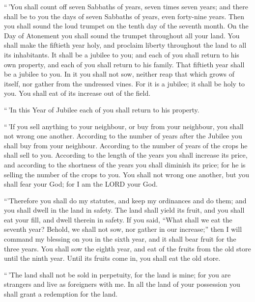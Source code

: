 ``\,'You shall count off seven Sabbaths of years, seven
times seven years; and there shall be to you the days of seven Sabbaths
of years, even forty-nine years.  Then you shall sound the
loud trumpet on the tenth day of the seventh month. On the Day of
Atonement you shall sound the trumpet throughout all your land.
 You shall make the fiftieth year holy, and proclaim
liberty throughout the land to all its inhabitants. It shall be a
jubilee to you; and each of you shall return to his own property, and
each of you shall return to his family.  That fiftieth year
shall be a jubilee to you. In it you shall not sow, neither reap that
which grows of itself, nor gather from the undressed vines.
 For it is a jubilee; it shall be holy to you. You shall
eat of its increase out of the field.

 ``\,'In this Year of Jubilee each of you shall return to
his property.

 ``\,'If you sell anything to your neighbour, or buy from
your neighbour, you shall not wrong one another.  According
to the number of years after the Jubilee you shall buy from your
neighbour. According to the number of years of the crops he shall sell
to you.  According to the length of the years you shall
increase its price, and according to the shortness of the years you
shall diminish its price; for he is selling the number of the crops to
you.  You shall not wrong one another, but you shall fear
your God; for I am the LORD your God.

 ``'Therefore you shall do my statutes, and keep my
ordinances and do them; and you shall dwell in the land in safety.
 The land shall yield its fruit, and you shall eat your
fill, and dwell therein in safety.  If you said, ``What
shall we eat the seventh year? Behold, we shall not sow, nor gather in
our increase;''  then I will command my blessing on you in
the sixth year, and it shall bear fruit for the three years.
 You shall sow the eighth year, and eat of the fruits from
the old store until the ninth year. Until its fruits come in, you shall
eat the old store.

 ``\,'The land shall not be sold in perpetuity, for the
land is mine; for you are strangers and live as foreigners with me.
 In all the land of your possession you shall grant a
redemption for the land.


